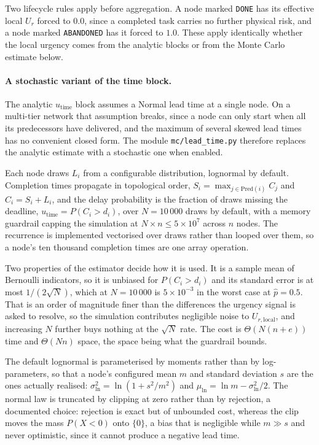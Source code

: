 Two lifecycle rules apply before aggregation. A node marked \texttt{DONE} has its effective
local $U_r$ forced to $0.0$, since a completed task carries no further physical risk, and a
node marked \texttt{ABANDONED} has it forced to $1.0$. These apply identically whether the
local urgency comes from the analytic blocks or from the Monte Carlo estimate below.

\paragraph{A stochastic variant of the time block.}
\label{sec:model_mc}

The analytic $u_{\text{time}}$ block assumes a Normal lead time at a single node. On a
multi-tier network that assumption breaks, since a node can only start when all its
predecessors have delivered, and the maximum of several skewed lead times has no convenient
closed form. The module \texttt{mc/lead\_time.py} therefore replaces the analytic estimate
with a stochastic one when enabled.

Each node draws $L_i$ from a configurable distribution, lognormal by default. Completion
times propagate in topological order, $S_i = \max_{j\in\text{Pred}(i)} C_j$ and $C_i = S_i + L_i$,
and the delay probability is the fraction of draws missing the deadline,
$u_{\text{time}} = P(C_i > d_i)$, over
$N = 10\,000$ draws by default, with a memory guardrail capping the simulation at
$N \times n \le 5\times 10^7$ across $n$ nodes.
The recurrence is implemented vectorised over draws rather than looped over them, so a
node's ten thousand completion times are one array operation.

Two properties of the estimator decide how it is used. It is a sample mean of Bernoulli
indicators, so it is unbiased for $P(C_i > d_i)$ and its standard error is at most
$1/(2\sqrt{N})$, which at $N = 10\,000$ is $5 \times 10^{-3}$ in the worst case at
$\hat{p} = 0.5$. That is an order of magnitude finer than the differences the urgency
signal is asked to resolve, so the simulation contributes negligible noise to
$U_{r,\text{local}}$, and increasing $N$ further buys nothing at the $\sqrt{N}$ rate. The
cost is $\Theta(N(n+e))$ time and $\Theta(Nn)$ space, the space being what the guardrail
bounds.

The default lognormal is parameterised by moments rather than by log-parameters, so that a
node's configured mean $m$ and standard deviation $s$ are the ones actually realised:
$\sigma^2_{\ln} = \ln(1 + s^2/m^2)$ and $\mu_{\ln} = \ln m - \sigma^2_{\ln}/2$. The normal
law is truncated by clipping at zero rather than by rejection, a documented choice: rejection
is exact but of unbounded cost, whereas the clip moves the mass $P(X<0)$ onto $\{0\}$, a bias
that is negligible while $m \gg s$ and never optimistic, since it cannot produce a negative
lead time.

